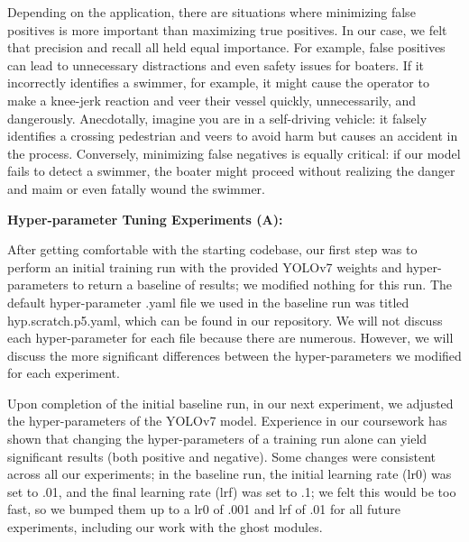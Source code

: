 \documentclass[sigplan,nonacm]{acmart}
\begin{document}
Depending on the application, there are situations where minimizing false positives is more important than maximizing true positives. In our case, we felt that precision and recall all held equal importance. For example, false positives can lead to unnecessary distractions and even safety issues for boaters. If it incorrectly identifies a swimmer, for example, it might cause the operator to make a knee-jerk reaction and veer their vessel quickly, unnecessarily, and dangerously. Anecdotally, imagine you are in a self-driving vehicle: it falsely identifies a crossing pedestrian and veers to avoid harm but causes an accident in the process. Conversely, minimizing false negatives is equally critical: if our model fails to detect a swimmer, the boater might proceed without realizing the danger and maim or even fatally wound the swimmer. 

\textbf{Hyper-parameter Tuning Experiments (A):}

After getting comfortable with the starting codebase, our first step was to perform an initial training run with the provided YOLOv7 weights and hyper-parameters to return a baseline of results; we modified nothing for this run. The default hyper-parameter .yaml file we used in the baseline run was titled hyp.scratch.p5.yaml, which can be found in our repository. We will not discuss each hyper-parameter for each file because there are numerous. However, we will discuss the more significant differences between the hyper-parameters we modified for each experiment. 

Upon completion of the initial baseline run, in our next experiment, we adjusted the hyper-parameters of the YOLOv7 model. Experience in our coursework has shown that changing the hyper-parameters of a training run alone can yield significant results (both positive and negative). Some changes were consistent across all our experiments; in the baseline run, the initial learning rate (lr0) was set to .01, and the final learning rate (lrf) was set to .1; we felt this would be too fast, so we bumped them up to a lr0 of .001 and lrf of .01 for all future experiments, including our work with the ghost modules. 
\end{document}
